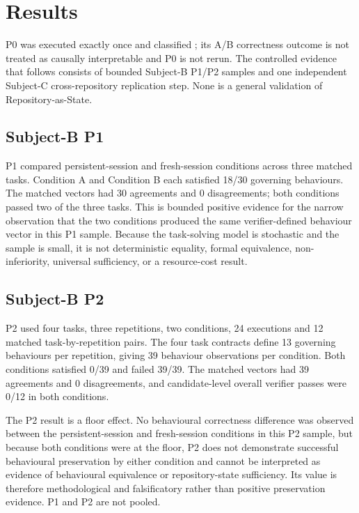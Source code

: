 \section{Results}
\label{sec:results}

P0 was executed exactly once and classified \mixedstatus; its A/B correctness outcome is not treated as causally interpretable and P0 is not rerun. The controlled evidence that follows consists of bounded Subject-B P1/P2 samples and one independent Subject-C cross-repository replication step. None is a general validation of Repository-as-State.

\subsection{Subject-B P1}

P1 compared persistent-session and fresh-session conditions across three matched tasks. Condition A and Condition B each satisfied 18/30 governing behaviours. The matched vectors had 30 agreements and 0 disagreements; both conditions passed two of the three tasks. This is bounded positive evidence for the narrow observation that the two conditions produced the same verifier-defined behaviour vector in this P1 sample. Because the task-solving model is stochastic and the sample is small, it is not deterministic equality, formal equivalence, non-inferiority, universal sufficiency, or a resource-cost result.

\subsection{Subject-B P2}

P2 used four tasks, three repetitions, two conditions, 24 executions and 12 matched task-by-repetition pairs. The four task contracts define 13 governing behaviours per repetition, giving 39 behaviour observations per condition. Both conditions satisfied 0/39 and failed 39/39. The matched vectors had 39 agreements and 0 disagreements, and candidate-level overall verifier passes were 0/12 in both conditions.

The P2 result is a floor effect. No behavioural correctness difference was observed between the persistent-session and fresh-session conditions in this P2 sample, but because both conditions were at the floor, P2 does not demonstrate successful behavioural preservation by either condition and cannot be interpreted as evidence of behavioural equivalence or repository-state sufficiency. Its value is therefore methodological and falsificatory rather than positive preservation evidence. P1 and P2 are not pooled.

